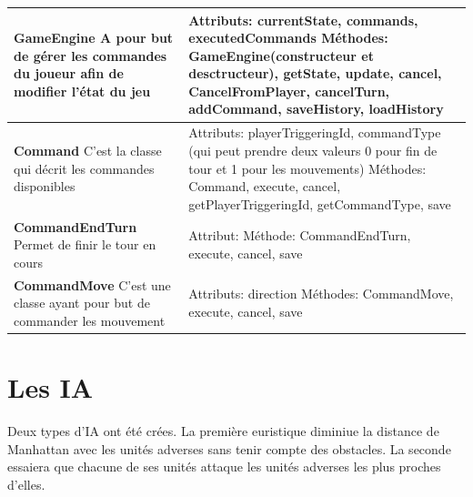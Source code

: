 \begin{tabularx}{15 cm}{|X|X|}
\hline
\textbf{GameEngine} \newline A pour but de gérer les commandes du joueur afin de modifier l'état du jeu & Attributs: currentState, commands, executedCommands \newline Méthodes: GameEngine(constructeur et desctructeur), getState, update, cancel, CancelFromPlayer, cancelTurn, addCommand, saveHistory, loadHistory\\ 
\hline
\textbf{Command} \newline C'est la classe qui décrit les commandes disponibles  & Attributs: playerTriggeringId, commandType (qui peut prendre deux valeurs 0 pour fin de tour et 1 pour les mouvements) \newline Méthodes: Command, execute, cancel, getPlayerTriggeringId, getCommandType, save\\
\hline
\textbf{CommandEndTurn} \newline Permet de finir le tour en cours & Attribut:  \newline Méthode: CommandEndTurn, execute, cancel, save\\
\hline
\textbf{CommandMove} \newline C'est une classe ayant pour but de commander les mouvement & Attributs: direction
\newline Méthodes: CommandMove, execute, cancel, save\\
\hline

\end{tabularx}

\newpage



\section{Les IA}

Deux types d'IA ont été crées.
La première euristique diminiue la distance de Manhattan avec les unités adverses sans tenir compte des obstacles.
La seconde essaiera que chacune de ses unités attaque les unités adverses les plus proches d'elles. 
\newline



